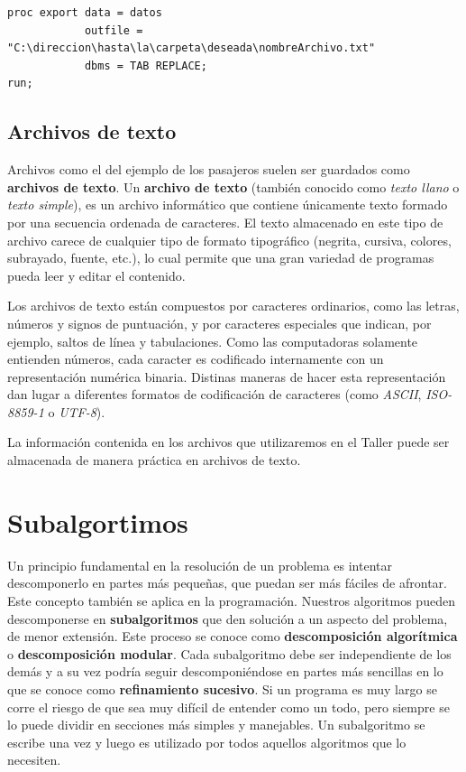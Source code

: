 \documentclass[]{book}
\begin{document}
\begin{verbatim}
proc export data = datos
            outfile = "C:\direccion\hasta\la\carpeta\deseada\nombreArchivo.txt" 
            dbms = TAB REPLACE;
run;
\end{verbatim}

\hypertarget{archivos-de-texto}{%
\section{Archivos de texto}\label{archivos-de-texto}}

Archivos como el del ejemplo de los pasajeros suelen ser guardados como \textbf{archivos de texto}. Un \textbf{archivo de texto} (también conocido como \emph{texto llano} o \emph{texto simple}), es un archivo informático que contiene únicamente texto formado por una secuencia ordenada de caracteres. El texto almacenado en este tipo de archivo carece de cualquier tipo de formato tipográfico (negrita, cursiva, colores, subrayado, fuente, etc.), lo cual permite que una gran variedad de programas pueda leer y editar el contenido.

Los archivos de texto están compuestos por caracteres ordinarios, como las letras, números y signos de puntuación, y por caracteres especiales que indican, por ejemplo, saltos de línea y tabulaciones. Como las computadoras solamente entienden números, cada caracter es codificado internamente con un representación numérica binaria. Distinas maneras de hacer esta representación dan lugar a diferentes formatos de codificación de caracteres (como \emph{ASCII}, \emph{ISO-8859-1} o \emph{UTF-8}).

La información contenida en los archivos que utilizaremos en el Taller puede ser almacenada de manera práctica en archivos de texto.

\hypertarget{subalgortimos}{%
\chapter{Subalgortimos}\label{subalgortimos}}

Un principio fundamental en la resolución de un problema es intentar descomponerlo en partes más pequeñas, que puedan ser más fáciles de afrontar. Este concepto también se aplica en la programación. Nuestros algoritmos pueden descomponerse en \textbf{subalgoritmos} que den solución a un aspecto del problema, de menor extensión. Este proceso se conoce como \textbf{descomposición algorítmica} o \textbf{descomposición modular}. Cada subalgoritmo debe ser independiente de los demás y a su vez podría seguir descomponiéndose en partes más sencillas en lo que se conoce como \textbf{refinamiento sucesivo}. Si un programa es muy largo se corre el riesgo de que sea muy difícil de entender como un todo, pero siempre se lo puede dividir en secciones más simples y manejables. Un subalgoritmo se escribe una vez y luego es utilizado por todos aquellos algoritmos que lo necesiten.
\end{document}
